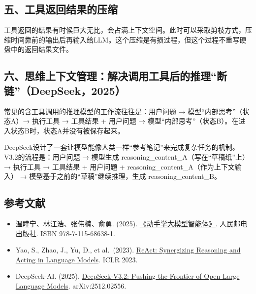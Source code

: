 \hypertarget{ux4e94ux5de5ux5177ux8fd4ux56deux7ed3ux679cux7684ux538bux7f29}{%
\subsection{五、工具返回结果的压缩}\label{ux4e94ux5de5ux5177ux8fd4ux56deux7ed3ux679cux7684ux538bux7f29}}

工具返回的结果有时候巨大无比，会占满上下文空间。此时可以采取剪枝方式，压缩时间靠前的输出后再输入给LLM。这个压缩是有损过程，但这个过程不重写硬盘中的返回结果文件。

\hypertarget{ux516dux601dux7ef4ux4e0aux4e0bux6587ux7ba1ux7406ux89e3ux51b3ux8c03ux7528ux5de5ux5177ux540eux7684ux63a8ux7406ux65adux94fedeepseek2025}{%
\subsection{六、思维上下文管理：解决调用工具后的推理``断链''（DeepSeek，2025）}\label{ux516dux601dux7ef4ux4e0aux4e0bux6587ux7ba1ux7406ux89e3ux51b3ux8c03ux7528ux5de5ux5177ux540eux7684ux63a8ux7406ux65adux94fedeepseek2025}}

常见的含工具调用的推理模型的工作流往往是：用户问题 → 模型``内部思考''（状态A）→ 执行工具 → 工具结果 + 用户问题 → 模型``内部思考''（状态B）。在进入状态B时，状态A并没有被保存起来。

DeepSeek设计了一套让模型能像人类一样``参考笔记''来完成复杂任务的机制。V3.2的流程是：用户问题 → 模型生成 reasoning\_content\_A（写在``草稿纸''上）→ 执行工具 → 工具结果 + 用户问题 + reasoning\_content\_A（作为上下文输入） → 模型基于之前的``草稿''继续推理，生成 reasoning\_content\_B。

\FloatBarrier
{}
\hypertarget{ux53c2ux8003ux6587ux732e-122}{%
\subsection{参考文献}\label{ux53c2ux8003ux6587ux732e-122}}

\vspace{0.25em}
\begin{itemize}
\tightlist
\item
  温睦宁、林江浩、张伟楠、俞勇. (2025). \href{https://haa.boyuai.com/}{《动手学大模型智能体》}. 人民邮电出版社. ISBN 978-7-115-68638-1.
\item
  Yao, S., Zhao, J., Yu, D., et al.~(2023). \href{https://arxiv.org/abs/2210.03629}{ReAct: Synergizing Reasoning and Acting in Language Models}. ICLR 2023.
\item
  DeepSeek-AI. (2025). \href{https://arxiv.org/abs/2512.02556}{DeepSeek-V3.2: Pushing the Frontier of Open Large Language Models}. arXiv:2512.02556.
\end{itemize}

\clearpage
